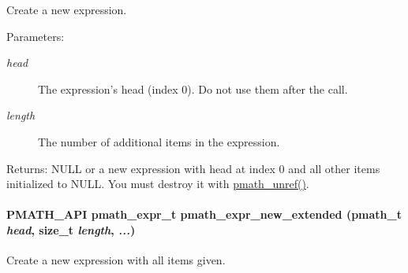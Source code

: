 Create a new expression. 

\begin{Desc}
\item[Parameters:]
\begin{description}
\item[{\em head}]The expression's head (index 0). Do not use them after the call. \item[{\em length}]The number of additional items in the expression. \end{description}
\end{Desc}
\begin{Desc}
\item[Returns:]NULL or a new expression with head at index 0 and all other items initialized to NULL. You must destroy it with \hyperlink{classpmath__t_54e905402c38940687033b87eb8c6c9f}{pmath\_\-unref()}. \end{Desc}
\hypertarget{group__expressions_ge2fc3e2cc7db617208f2ef97deed49d7}{
\paragraph[{pmath\_\-expr\_\-new\_\-extended}]{\setlength{\rightskip}{0pt plus 5cm}PMATH\_\-API {\bf pmath\_\-expr\_\-t} pmath\_\-expr\_\-new\_\-extended ({\bf pmath\_\-t} {\em head}, \/  size\_\-t {\em length}, \/   {\em ...})}\hfill}
\label{group__expressions_ge2fc3e2cc7db617208f2ef97deed49d7}


Create a new expression with all items given. 

